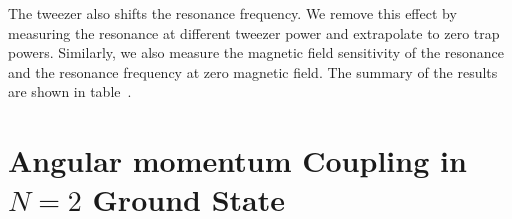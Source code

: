 The tweezer also shifts the resonance frequency.
We remove this effect by measuring the resonance at different tweezer power
and extrapolate to zero trap powers.
Similarly, we also measure the magnetic field sensitivity of the resonance and
the resonance frequency at zero magnetic field.
The summary of the results are shown in table~\todo{}.

\section{Angular momentum Coupling in $N=2$ Ground State}
\label{ch:raman-spectroscopy:n2}

